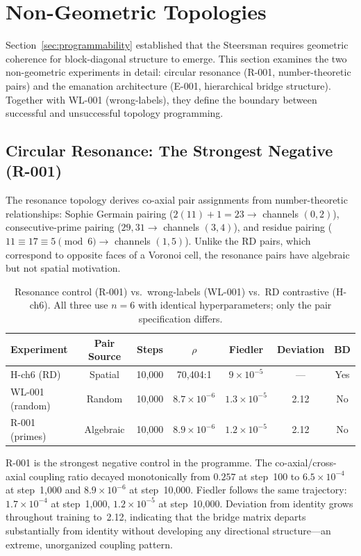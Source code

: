 \section{Non-Geometric Topologies}
\label{sec:nongeometric}

Section~\ref{sec:programmability} established that the Steersman
requires geometric coherence for block-diagonal structure to emerge.
This section examines the two non-geometric experiments in detail:
circular resonance (R-001, number-theoretic pairs) and the emanation
architecture (E-001, hierarchical bridge structure). Together with
WL-001 (wrong-labels), they define the boundary between successful
and unsuccessful topology programming.

\subsection{Circular Resonance: The Strongest Negative (R-001)}

The resonance topology derives co-axial pair assignments from
number-theoretic relationships: Sophie Germain pairing
($2(11) + 1 = 23 \to$ channels $(0, 2)$), consecutive-prime pairing
($29, 31 \to$ channels $(3, 4)$), and residue pairing
($11 \equiv 17 \equiv 5 \pmod{6} \to$ channels $(1, 5)$). Unlike
the RD pairs, which correspond to opposite faces of a Voronoi cell,
the resonance pairs have algebraic but not spatial motivation.

\begin{table}[H]
\centering
\caption{Resonance control (R-001) vs.\ wrong-labels (WL-001) vs.\
  RD contrastive (H-ch6). All three use $n = 6$ with identical
  hyperparameters; only the pair specification differs.}
\label{tab:resonance}
\small
\begin{tabular}{lcccccc}
\toprule
Experiment & Pair Source & Steps & $\rho$ & Fiedler & Deviation & BD \\
\midrule
H-ch6 (RD) & Spatial & 10{,}000 & 70{,}404:1 & $9 \times 10^{-5}$ & --- & Yes \\
WL-001 (random) & Random & 10{,}000 & $8.7 \times 10^{-6}$ & $1.3 \times 10^{-5}$ & 2.12 & No \\
R-001 (primes) & Algebraic & 10{,}000 & $8.9 \times 10^{-6}$ & $1.2 \times 10^{-5}$ & 2.12 & No \\
\bottomrule
\end{tabular}
\end{table}

R-001 is the strongest negative control in the programme. The
co-axial/cross-axial coupling ratio decayed monotonically from
$0.257$ at step~100 to $6.5 \times 10^{-4}$ at step~1{,}000 and
$8.9 \times 10^{-6}$ at step~10{,}000. Fiedler follows the same
trajectory: $1.7 \times 10^{-4}$ at step~1{,}000, $1.2 \times 10^{-5}$
at step~10{,}000. Deviation from identity grows throughout training
to~2.12, indicating that the bridge matrix departs substantially
from identity without developing any directional structure---an
extreme, unorganized coupling pattern.

